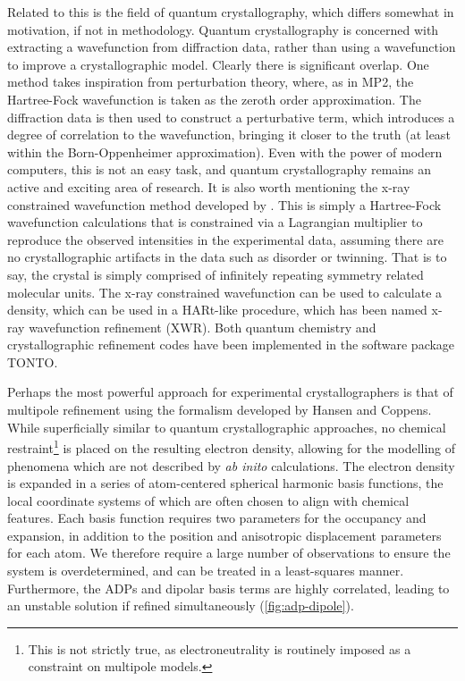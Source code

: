 \begin{refsection}
Related to this is the field of quantum crystallography, which differs somewhat in motivation, if not in methodology.
Quantum crystallography is concerned with extracting a wavefunction from diffraction data, rather than using a wavefunction to improve a crystallographic model.
Clearly there is significant overlap.
One method takes inspiration from perturbation theory, where, as in MP2, the Hartree-Fock wavefunction is taken as the zeroth order approximation.
The diffraction data is then used to construct a perturbative term, which introduces a degree of correlation to the wavefunction, bringing it closer to the truth (at least within the Born-Oppenheimer approximation).\autocite{Weiss1962}
Even with the power of modern computers, this is not an easy task, and quantum crystallography remains an active and exciting area of research.
It is also worth mentioning the x-ray constrained wavefunction method developed by \citeauthor{Grimwood2003}.\autocite{Grimwood2003}
This is simply a Hartree-Fock wavefunction calculations that is constrained via a Lagrangian multiplier to reproduce the observed intensities in the experimental data, assuming there are no crystallographic artifacts in the data such as disorder or twinning.
That is to say, the crystal is simply comprised of infinitely repeating symmetry related molecular units.
The x-ray constrained wavefunction can be used to calculate a density, which can be used in a HARt-like procedure, which has been named x-ray wavefunction refinement (XWR).\autocite{Woinska2017}
Both quantum chemistry and crystallographic refinement codes have been implemented in the software package TONTO.\autocite{Jayatilaka2003}

Perhaps the most powerful approach for experimental crystallographers is that of multipole refinement using the formalism developed by Hansen and Coppens.\autocite{Hansen1978}
While superficially similar to quantum crystallographic approaches, no chemical restraint\footnote{This is not strictly true, as electroneutrality is routinely imposed as a constraint on multipole models.} is placed on the resulting electron density, allowing for the modelling of phenomena which are not described by \emph{ab inito} calculations.
The electron density is expanded in a series of atom-centered spherical harmonic basis functions, the local coordinate systems of which are often chosen to align with chemical features.
Each basis function requires two parameters for the occupancy and expansion, in addition to the position and anisotropic displacement parameters for each atom.
We therefore require a large number of observations to ensure the system is overdetermined, and can be treated in a least-squares manner.
Furthermore, the ADPs and dipolar basis terms are highly correlated, leading to an unstable solution if refined simultaneously (\cref{fig:adp-dipole}).


\end{refsection}
